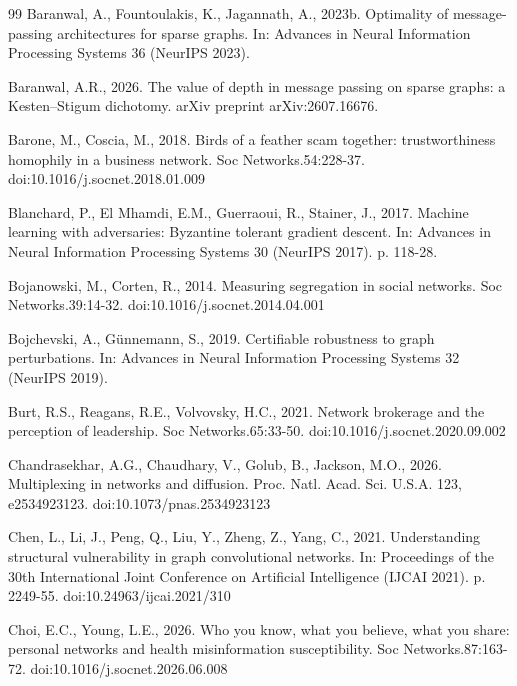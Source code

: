 \documentclass[preprint,12pt,authoryear]{elsarticle}
\theoremstyle{definition}
\begin{document}
\begin{thebibliography}{99}
Baranwal, A., Fountoulakis, K., Jagannath, A., 2023b. Optimality of message-passing architectures for sparse graphs. In: Advances in Neural Information Processing Systems 36 (NeurIPS 2023).

Baranwal, A.R., 2026. The value of depth in message passing on sparse graphs: a Kesten--Stigum dichotomy. arXiv preprint arXiv:2607.16676.

Barone, M., Coscia, M., 2018. Birds of a feather scam together: trustworthiness homophily in a business network. Soc Networks.54:228-37. doi:10.1016/j.socnet.2018.01.009

Blanchard, P., El Mhamdi, E.M., Guerraoui, R., Stainer, J., 2017. Machine learning with adversaries: Byzantine tolerant gradient descent. In: Advances in Neural Information Processing Systems 30 (NeurIPS 2017). p. 118-28.

Bojanowski, M., Corten, R., 2014. Measuring segregation in social networks. Soc Networks.39:14-32. doi:10.1016/j.socnet.2014.04.001

Bojchevski, A., G\"unnemann, S., 2019. Certifiable robustness to graph perturbations. In: Advances in Neural Information Processing Systems 32 (NeurIPS 2019).

Burt, R.S., Reagans, R.E., Volvovsky, H.C., 2021. Network brokerage and the perception of leadership. Soc Networks.65:33-50. doi:10.1016/j.socnet.2020.09.002

Chandrasekhar, A.G., Chaudhary, V., Golub, B., Jackson, M.O., 2026. Multiplexing in networks and diffusion. Proc. Natl. Acad. Sci. U.S.A. 123, e2534923123. doi:10.1073/pnas.2534923123

Chen, L., Li, J., Peng, Q., Liu, Y., Zheng, Z., Yang, C., 2021. Understanding structural vulnerability in graph convolutional networks. In: Proceedings of the 30th International Joint Conference on Artificial Intelligence (IJCAI 2021). p. 2249-55. doi:10.24963/ijcai.2021/310

Choi, E.C., Young, L.E., 2026. Who you know, what you believe, what you share: personal networks and health misinformation susceptibility. Soc Networks.87:163-72. doi:10.1016/j.socnet.2026.06.008


\end{thebibliography}
\end{document}
